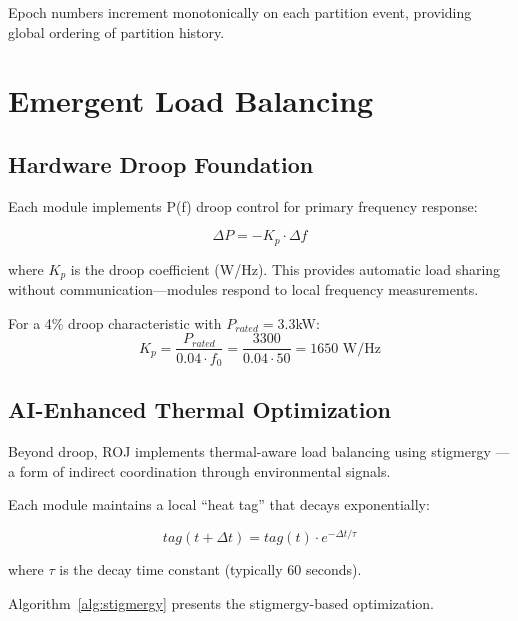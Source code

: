 \documentclass[conference,10pt]{IEEEtran}
\begin{document}
Epoch numbers increment monotonically on each partition event, providing global ordering of partition history.

\section{Emergent Load Balancing}
\label{sec:loadbalancing}

\subsection{Hardware Droop Foundation}

Each module implements P(f) droop control for primary frequency response:

\begin{equation}
\Delta P = -K_p \cdot \Delta f
\end{equation}

where $K_p$ is the droop coefficient (W/Hz). This provides automatic load sharing without communication---modules respond to local frequency measurements.

For a 4\% droop characteristic with $P_{rated} = 3.3$kW:
$$K_p = \frac{P_{rated}}{0.04 \cdot f_0} = \frac{3300}{0.04 \cdot 50} = 1650 \text{ W/Hz}$$

\subsection{AI-Enhanced Thermal Optimization}

Beyond droop, ROJ implements thermal-aware load balancing using stigmergy \cite{bonabeau1999swarm}---a form of indirect coordination through environmental signals.

Each module maintains a local ``heat tag'' that decays exponentially:

\begin{equation}
tag(t + \Delta t) = tag(t) \cdot e^{-\Delta t / \tau}
\end{equation}

where $\tau$ is the decay time constant (typically 60 seconds).

Algorithm~\ref{alg:stigmergy} presents the stigmergy-based optimization.
\end{document}
